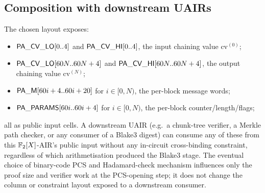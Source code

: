 \subsection{Composition with downstream UAIRs}

The chosen layout exposes:
\begin{itemize}
\item $\mathsf{PA\_CV\_LO}[0..4]$ and $\mathsf{PA\_CV\_HI}[0..4]$,
   the input chaining value $\mathrm{cv}^{(0)}$;
\item $\mathsf{PA\_CV\_LO}[60N..60N+4]$ and
   $\mathsf{PA\_CV\_HI}[60N..60N+4]$, the output chaining value
   $\mathrm{cv}^{(N)}$;
\item $\mathsf{PA\_M}[60i+4..60i+20]$ for $i \in [0,N)$, the
   per-block message words;
\item $\mathsf{PA\_PARAMS}[60i..60i+4]$ for $i \in [0,N)$, the
   per-block counter/length/flags;
\end{itemize}
all as public input cells. A downstream UAIR (e.g.\ a chunk-tree
verifier, a Merkle path checker, or any consumer of a Blake3 digest)
can consume any of these from this $\mathbb{F}_2[X]$-AIR's public input
without any in-circuit cross-binding constraint, regardless of which
arithmetisation produced the Blake3 stage. The eventual choice of
binary-code PCS and Hadamard-check mechanism influences only the
proof size and verifier work at the PCS-opening step; it does not
change the column or constraint layout exposed to a downstream
consumer.
